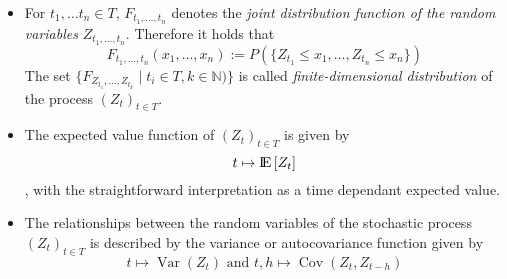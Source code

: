 \documentclass[12pt]{article}
\newcommand{\E}{\mbox{I\negthinspace E}}
\DeclareMathOperator{\Var}{Var}
\DeclareMathOperator{\Cov}{Cov}
\begin{document}
\begin{itemize}
\item{For $t_1, \dots t_n \in T$, $F_{t_1, \dots , t_n}$ denotes the \textit{joint distribution function of the random variables} $Z_{t_1, \dots , t_n}$. Therefore it holds that
\[
F_{t_1, \dots , t_n}(x_1, \dots , x_n) := P(\{Z_{t_1} \leq x_1 , \dots , Z_{t_n} \leq x_n\})
\]
The set $\{F_{Z_{t_1}, \dots , Z_{t_k}}\mid t_i \in T , k \in \mathbb{N})\}$ is called \textit{finite-dimensional distribution} of the process $(Z_t)_{t \in T}$.
}
\item{The expected value function of $(Z_t)_{t \in T}$ is given by \[
t \mapsto \E \left[ Z_t\right]
\], with the straightforward interpretation as a time dependant expected value.}
\item{The relationships between the random variables of the stochastic process $(Z_t)_{t \in T}$ is described by the variance or autocovariance function given by \[
t \mapsto \Var ( Z_t) \text{ and } t, h \mapsto \Cov ( Z_t, Z_{t-h})
\]}
\end{itemize}
\end{document}
